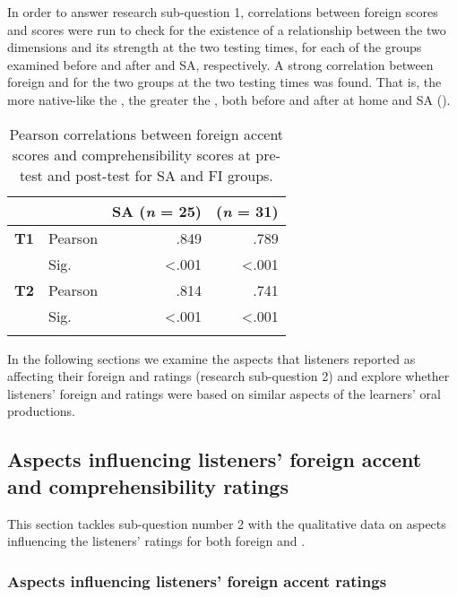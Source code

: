 \documentclass[output=paper]{langsci/langscibook}
\begin{document}
In order to answer research sub-question 1, correlations between foreign  scores and  scores were run to check for the existence of a relationship between the two dimensions and its strength at the two testing times, for each of the groups examined before and after  and SA, respectively. A strong correlation between foreign  and  for the two groups at the two testing times was found. That is, the more native-like the , the greater the , both before and after  at home and SA (). 

\begin{table}
\caption{Pearson correlations between foreign accent scores and comprehensibility scores at pre-test and post-test for SA and FI groups.}
\label{tab:delrio:1}

\begin{tabularx}{.8\textwidth}{XQrr}
\lsptoprule
&  & \bfseries SA (\textit{n} = 25) & \bfseries {} (\textit{n} = 31)\\
\midrule
\bfseries T1 & Pearson & .849 & .789\\
& Sig. & <.001 & <.001\\
\bfseries T2 & Pearson & .814 & .741\\
& Sig. & <.001 & <.001\\ 
\lspbottomrule
\end{tabularx}
\end{table}

In the following sections we examine the aspects that listeners reported as affecting their foreign  and  ratings (research sub-question 2) and explore whether listeners’ foreign  and  ratings were based on similar aspects of the learners’ oral productions.

\newpage
\subsection{Aspects influencing listeners’ foreign accent and comprehensibility ratings} 


This section tackles sub-question number 2 with the qualitative data on aspects influencing the listeners’ ratings for both foreign  and . 


\subsubsection{Aspects influencing listeners’ foreign accent ratings}
\end{document}
